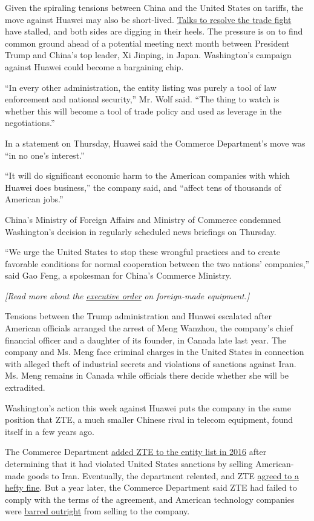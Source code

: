 Given the spiraling tensions between China and the United States on
tariffs, the move against Huawei may also be short-lived.
\href{https://www.nytimes.com/2019/05/15/business/us-china-trade-war-economy.html}{Talks
to resolve the trade fight} have stalled, and both sides are digging in
their heels. The pressure is on to find common ground ahead of a
potential meeting next month between President Trump and China's top
leader, Xi Jinping, in Japan. Washington's campaign against Huawei could
become a bargaining chip.

``In every other administration, the entity listing was purely a tool of
law enforcement and national security,'' Mr. Wolf said. ``The thing to
watch is whether this will become a tool of trade policy and used as
leverage in the negotiations.''

In a statement on Thursday, Huawei said the Commerce Department's move
was ``in no one's interest.''

``It will do significant economic harm to the American companies with
which Huawei does business,'' the company said, and ``affect tens of
thousands of American jobs.''

China's Ministry of Foreign Affairs and Ministry of Commerce condemned
Washington's decision in regularly scheduled news briefings on Thursday.

``We urge the United States to stop these wrongful practices and to
create favorable conditions for normal cooperation between the two
nations' companies,'' said Gao Feng, a spokesman for China's Commerce
Ministry.

\emph{{[}Read more about the}
\href{https://www.nytimes.com/2019/05/15/business/huawei-ban-trump.html}{\emph{executive
order}} \emph{on foreign-made equipment.{]}}

Tensions between the Trump administration and Huawei escalated after
American officials arranged the arrest of Meng Wanzhou, the company's
chief financial officer and a daughter of its founder, in Canada late
last year. The company and Ms. Meng face criminal charges in the United
States in connection with alleged theft of industrial secrets and
violations of sanctions against Iran. Ms. Meng remains in Canada while
officials there decide whether she will be extradited.

Washington's action this week against Huawei puts the company in the
same position that ZTE, a much smaller Chinese rival in telecom
equipment, found itself in a few years ago.

The Commerce Department
\href{https://www.nytimes.com/2016/03/08/technology/us-restricts-sales-to-zte-saying-it-breached-sanctions.html}{added
ZTE to the entity list in 2016} after determining that it had violated
United States sanctions by selling American-made goods to Iran.
Eventually, the department relented, and ZTE
\href{https://www.nytimes.com/2017/03/07/technology/zte-china-fine.html}{agreed
to a hefty fine}. But a year later, the Commerce Department said ZTE had
failed to comply with the terms of the agreement, and American
technology companies were
\href{https://www.nytimes.com/2018/04/16/technology/chinese-tech-company-blocked-from-buying-american-components.html}{barred
outright} from selling to the company.

